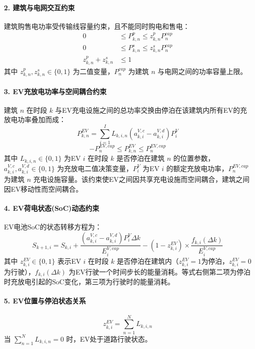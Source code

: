 \documentclass[11pt]{ctexart}
\begin{document}
\paragraph{2. 建筑与电网交互约束}
建筑购售电功率受传输线容量约束，且不能同时购电和售电：
\begin{align}
    0 &\le P_{k,n}^p \le z_{k,n}^p P_n^{cap} \\
    0 &\le P_{k,n}^s \le z_{k,n}^s P_n^{cap} \\
    z_{k,n}^p + z_{k,n}^s &\le 1
\end{align}
其中 $z_{k,n}^p, z_{k,n}^s \in \{0,1\}$ 为二值变量，$P_n^{cap}$ 为建筑 $n$ 与电网之间的功率容量上限。

\paragraph{3. EV充放电功率与空间耦合约束}
建筑 $n$ 在时段 $k$ 与EV充电设施之间的总功率交换由停泊在该建筑内所有EV的充放电功率叠加而成：
\begin{equation}
    P_{k,n}^{EV} = \sum_{i=1}^{I} L_{k,i,n} \left( a_{k,i}^{V,c} - a_{k,i}^{V,d} \right) P_i^V
\end{equation}
\begin{equation}
    -P_n^{EV,cap} \le P_{k,n}^{EV} \le P_n^{EV,cap}
\end{equation}
其中 $L_{k,i,n} \in \{0,1\}$ 为EV $i$ 在时段 $k$ 是否停泊在建筑 $n$ 的位置参数，$a_{k,i}^{V,c}, a_{k,i}^{V,d} \in \{0,1\}$ 为充放电二值决策变量，$P_i^V$ 为EV $i$ 的额定充放电功率，$P_n^{EV,cap}$ 为建筑 $n$ 充电设施容量。该约束使EV之间因共享充电设施而空间耦合，建筑之间因EV移动性而空间耦合。

\paragraph{4. EV荷电状态(SoC)动态约束}
EV电池SoC的状态转移方程为：
\begin{equation}
    S_{k+1,i} = S_{k,i} + \frac{(a_{k,i}^{V,c} - a_{k,i}^{V,d}) P_i^V \Delta k}{E_i^{V,cap}} - (1 - z_{k,i}^{EV}) \times \frac{f_{k,i}(\Delta k)}{E_i^{V,cap}}
\end{equation}
其中 $z_{k,i}^{EV} \in \{0,1\}$ 表示EV $i$ 在时段 $k$ 是否停泊在建筑内（$z_{k,i}^{EV}=1$为停泊，$z_{k,i}^{EV}=0$为行驶），$f_{k,i}(\Delta k)$ 为EV行驶一个时间步长的能量消耗。等式右侧第二项为停泊时充放电引起的SoC变化，第三项为行驶时的能量消耗。

\paragraph{5. EV位置与停泊状态关系}
\begin{equation}
    z_{k,i}^{EV} = \sum_{n=1}^{N} L_{k,i,n}
\end{equation}
当 $\sum_{n=1}^{N} L_{k,i,n} = 0$ 时，EV处于道路行驶状态。
\end{document}
